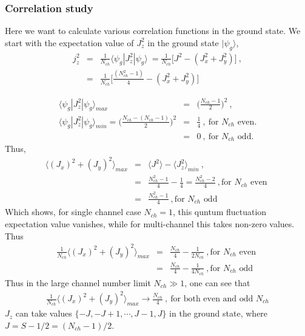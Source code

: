 \documentclass[reprint,prb,superscriptaddress]{revtex4-2}
\begin{document}
\subsubsection{Correlation study}
Here we want to calculate various correlation functions in the ground state. We start with the expectation value of $J_z^2$ in the ground state $|\psi_g\rangle$,
\begin{eqnarray}
j_z^2&=&\frac{1}{N_{ch}}\langle \psi_g | J_z^2 | \psi_g \rangle~=\frac{1}{N_{ch}} \bigg[ J^2-(J_x^2+J_y^2) \bigg] ~,\nonumber\\
&=& \frac{1}{N_{ch}} \bigg[ \frac{(N_{ch}^2-1)}{4}-(J_x^2+J_y^2) \bigg]
\end{eqnarray}

\begin{eqnarray}
\langle \psi_g | J_{z}^2 | \psi_g \rangle_{max} &=& \bigg(\frac{N_{ch}-1}{2}\bigg)^2~,\nonumber\\
\langle \psi_g | J_{z}^2 | \psi_g \rangle_{min} = \bigg(\frac{N_{ch}-(N_{ch}-1)}{2}\bigg)^2&=&\frac{1}{4}~,~\textrm{for $N_{ch}$ even}.\nonumber\\
&=& 0 ~,~\textrm{for $N_{ch}$ odd}.
\end{eqnarray}
Thus,
\begin{eqnarray}
\langle (J_x)^2+(J_y)^2 \rangle_{max}&=&\langle J^2 \rangle - \langle J_z^2 \rangle_{min} ~,\nonumber\\
&=& \frac{N_{ch}^2-1}{4}-\frac{1}{4}=\frac{N_{ch}^2-2}{4}~, \textrm{for $N_{ch}$ even } \nonumber\\
&=& \frac{N_{ch}^2-1}{4}~, \textrm{for $N_{ch}$ odd } \nonumber
\end{eqnarray}
Which shows, for single channel case $N_{ch}=1$, this quntum fluctuation expectation value vanishes, while for multi-channel this takes non-zero values. Thus 
\begin{eqnarray}
\frac{1}{N_{ch}}\langle (J_x)^2+(J_y)^2 \rangle_{max}
&=& \frac{N_{ch}}{4}-\frac{1}{2N_{ch}}  ~, \textrm{for $N_{ch}$ even } \nonumber\\
&=& \frac{N_{ch}}{4}-\frac{1}{4N_{ch}}~, \textrm{for $N_{ch}$ odd } \nonumber
\end{eqnarray}
Thus in the large channel number limit $N_{ch}\gg 1$, one can see that 
\begin{eqnarray}
\frac{1}{N_{ch}}\langle (J_x)^2+(J_y)^2 \rangle_{max}
\rightarrow \frac{N_{ch}}{4}~,~\textrm{for both even and odd $N_{ch}$}
\end{eqnarray}
\noindent $J_z$ can take values $\{-J,-J+1,\cdots,J-1,J\}$ in the ground state, where $J=S-1/2=(N_{ch}-1)/2$.
\end{document}
